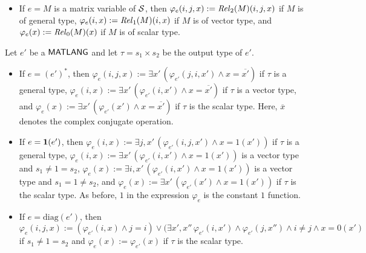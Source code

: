 \begin{itemize}
\item If $e = M$ is a matrix variable of $\mathcal{S}$, then $\varphi_e(i,j,x):=\mathit{Rel}_2(M)(i,j,x)$ if $M$ is of general type,
 $\varphi_e(i,x):=\mathit{Rel}_1(M)(i,x)$ if $M$ is of vector type, and $\varphi_e(x):=\mathit{Rel}_0(M)(x)$ if $M$ is of scalar type.
\end{itemize}
Let $e'$ be a $\mathsf{MATLANG}$ and let $\tau = s_1 \times s_2$ be the output type of $e'$.
\begin{itemize}
\item If $e = (e')^*$, then  $\varphi_e(i,j,x):=\exists x'\, (\varphi_{e'}(j,i,x')\land x=\overline{x'})$ if $\tau$ is a general type,
$\varphi_e(i,x):=\exists x'\, (\varphi_{e'}(i,x')\land x=\overline{x'})$ if $\tau$ is a vector type, and $\varphi_e(x):=\exists x'\, (\varphi_{e'}(x')\land x=\overline{x'})$ if $\tau$ is the scalar type.
Here, $\overline x$ denotes the complex conjugate operation.

\item If $e = \mathbf{1}(e')$, then $\varphi_e(i,x):=\exists j, x'\, (\varphi_{e'}(i,j,x')\land x=1(x'))$ if $\tau$ is a general type,
$\varphi_e(i,x):=\exists  x'\, (\varphi_{e'}(i,x')\land x=1(x'))$  is a vector type and $s_1\neq 1=s_2$, 
$\varphi_e(x):=\exists  i,x'\, (\varphi_{e'}(i,x')\land x=1(x'))$  is a vector type and $s_1=1\neq s_2$, 
and $\varphi_e(x):=\exists x'\, (\varphi_{e'}(x')\land x=1(x'))$  if $\tau$ is the scalar type. As before,  $1$ in the expression $\varphi_e$ is the constant $1$ function.


\item If $e = \mathrm{diag}(e')$, then $\varphi_e(i,j,x):=(\varphi_{e'}(i,x)\land j=i)\vee (\exists x',x''\, \varphi_{e'}(i,x')\land\varphi_{e'}(j,x'')\land i\neq j \land x=0(x')$
if $s_1 \neq 1 = s_2$ and  $\varphi_e(x):=\varphi_{e'}(x)$ if $\tau$ is the scalar type.



\end{itemize}
